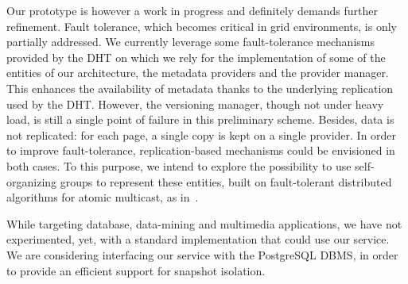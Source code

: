 \documentclass{llncs}
\begin{document}
Our prototype is however a work in progress and definitely demands further
refinement. Fault tolerance, which becomes critical in grid
environments, is only partially addressed. We currently leverage some
fault-tolerance mechanisms provided by the DHT on which we rely for
the implementation of some of the entities of our architecture, the
metadata providers and the provider manager. This enhances the
availability of metadata thanks to the underlying replication used by
the DHT. However, the versioning manager, though not under heavy load,
is still a single point of failure in this preliminary
scheme. Besides, data is not replicated: for each page, a single copy
is kept on a single provider. In order to improve fault-tolerance,
replication-based mechanisms could be envisioned in both cases. To this
purpose, we intend to explore the possibility to use self-organizing
groups to represent these entities, built on fault-tolerant
distributed algorithms for atomic multicast, as
in~\cite{AntDevMon06CPE}.

While targeting database, data-mining and multimedia applications, we
have not experimented, yet, with a standard implementation that could
use our service. We are considering interfacing our service with the
PostgreSQL DBMS, in order to provide an efficient support for snapshot
isolation.






\end{document}
